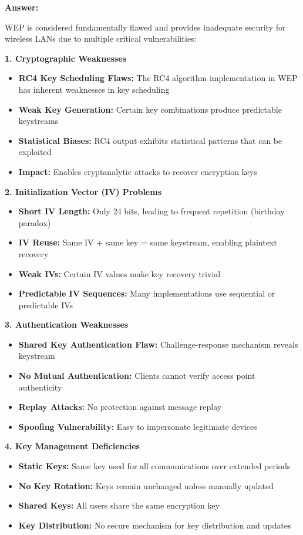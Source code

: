 \documentclass[12pt,a4paper]{article}
\begin{document}
\textbf{Answer:}

WEP is considered fundamentally flawed and provides inadequate security for wireless LANs due to multiple critical vulnerabilities:

\textbf{1. Cryptographic Weaknesses}
\begin{itemize}
    \item \textbf{RC4 Key Scheduling Flaws:} The RC4 algorithm implementation in WEP has inherent weaknesses in key scheduling
    \item \textbf{Weak Key Generation:} Certain key combinations produce predictable keystreams
    \item \textbf{Statistical Biases:} RC4 output exhibits statistical patterns that can be exploited
    \item \textbf{Impact:} Enables cryptanalytic attacks to recover encryption keys
\end{itemize}

\textbf{2. Initialization Vector (IV) Problems}
\begin{itemize}
    \item \textbf{Short IV Length:} Only 24 bits, leading to frequent repetition (birthday paradox)
    \item \textbf{IV Reuse:} Same IV + same key = same keystream, enabling plaintext recovery
    \item \textbf{Weak IVs:} Certain IV values make key recovery trivial
    \item \textbf{Predictable IV Sequences:} Many implementations use sequential or predictable IVs
\end{itemize}

\textbf{3. Authentication Weaknesses}
\begin{itemize}
    \item \textbf{Shared Key Authentication Flaw:} Challenge-response mechanism reveals keystream
    \item \textbf{No Mutual Authentication:} Clients cannot verify access point authenticity
    \item \textbf{Replay Attacks:} No protection against message replay
    \item \textbf{Spoofing Vulnerability:} Easy to impersonate legitimate devices
\end{itemize}

\textbf{4. Key Management Deficiencies}
\begin{itemize}
    \item \textbf{Static Keys:} Same key used for all communications over extended periods
    \item \textbf{No Key Rotation:} Keys remain unchanged unless manually updated
    \item \textbf{Shared Keys:} All users share the same encryption key
    \item \textbf{Key Distribution:} No secure mechanism for key distribution and updates
\end{itemize}
\end{document}
